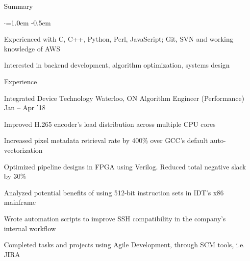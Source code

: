 \documentclass{resume} %
\begin{document}

\begin{rSection}{Summary}
  \vspace{0.5em}
  \begin{list}{$\cdot$}{\leftmargin=1.0em}
    \itemsep -0.5em \vspace{-0.5em}
    \item Experienced with C, C++, Python, Perl, JavaScript; Git, SVN and working knowledge of AWS
	\item Interested in backend development, algorithm optimization, systems design
  \end{list}
  \vspace{0.5em}
\end{rSection}


\begin{rSection}{Experience}
  \begin{rWorkSection}{Integrated Device Technology}
                     {Waterloo, ON}
                     {Algorithm Engineer (Performance)}
                     {Jan -- Apr '18}
    \item Improved H.265 encoder's load distribution across multiple CPU cores
    \item Increased pixel metadata retrieval rate by 400\% over GCC's default
    auto-vectorization
    \item Optimized pipeline designs in FPGA using Verilog. Reduced total
	  negative slack by 30\%
	  \item Analyzed potential benefits of using 512-bit instruction sets in 
	  IDT's x86 mainframe
    \item Wrote automation scripts to improve SSH compatibility in the
	  company's internal workflow
	  \item Completed tasks and projects using Agile Development, through SCM 
    tools, i.e. JIRA
  \end{rWorkSection}
\end{rSection}
\end{document}
